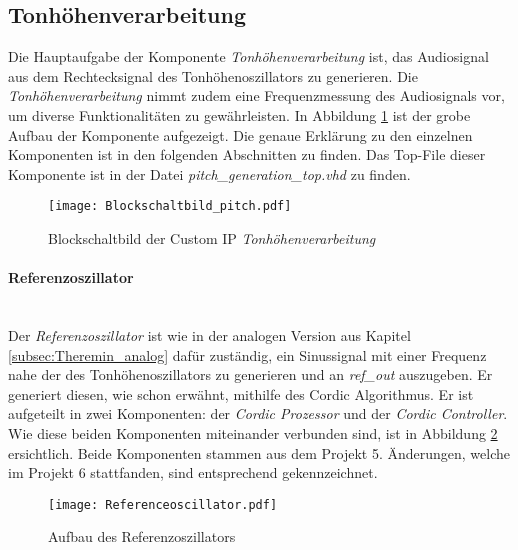 \subsection{Tonhöhenverarbeitung}\label{subsec:Pitch_Generation}

Die Hauptaufgabe der Komponente \textit{Tonhöhenverarbeitung} ist, das Audiosignal aus dem Rechtecksignal des Tonhöhenoszillators zu generieren. Die \textit{Tonhöhenverarbeitung} nimmt zudem eine Frequenzmessung des Audiosignals vor, um diverse Funktionalitäten zu gewährleisten. In Abbildung \ref{img:Blockschaltbild_pitch} ist der grobe Aufbau der Komponente aufgezeigt. Die genaue Erklärung zu den einzelnen Komponenten ist in den folgenden Abschnitten zu finden. Das Top-File dieser Komponente ist in der Datei \textit{pitch\_generation\_top.vhd} zu finden.


\begin{figure}[h!]
	\centering
	\texttt{[image: Blockschaltbild\_pitch.pdf]}
	\caption{Blockschaltbild der Custom IP \textit{Tonhöhenverarbeitung}} 
	\label{img:Blockschaltbild_pitch}
\end{figure}  



\paragraph{Referenzoszillator}\mbox{}\\

Der \textit{Referenzoszillator} ist wie in der analogen Version aus Kapitel \ref{subsec:Theremin_analog} dafür zuständig, ein Sinussignal mit einer Frequenz nahe der des Tonhöhenoszillators zu generieren und an \textit{ref\_out} auszugeben. Er generiert diesen, wie schon erwähnt, mithilfe des Cordic Algorithmus. Er ist aufgeteilt in zwei Komponenten: der \textit{Cordic Prozessor} und der \textit{Cordic Controller}. Wie diese beiden Komponenten miteinander verbunden sind, ist in Abbildung \ref{img:Referenceoscillator} ersichtlich. Beide Komponenten stammen aus dem Projekt 5. Änderungen, welche im Projekt 6 stattfanden, sind entsprechend gekennzeichnet. \\

\begin{figure}[t]
	\centering
	\texttt{[image: Referenceoscillator.pdf]}
	\caption{Aufbau des Referenzoszillators} 
	\label{img:Referenceoscillator}
\end{figure}  

